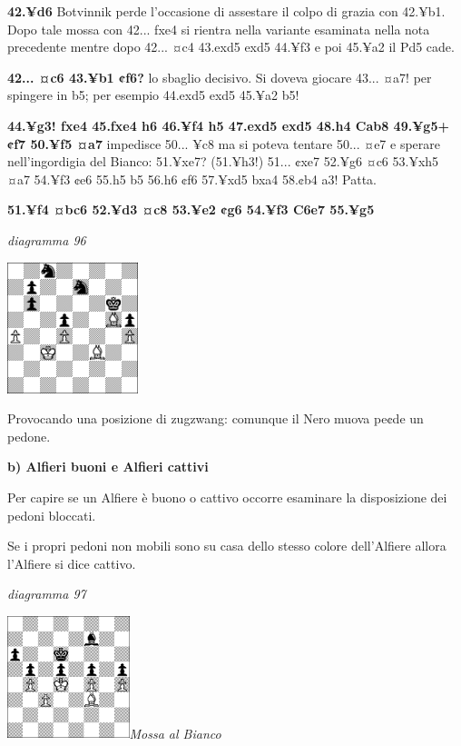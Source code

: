 \documentclass[
]{article}
\begin{document}
\textbf{42.¥d6} Botvinnik perde l'occasione di assestare il colpo di
grazia con 42.¥b1. Dopo tale mossa con 42... fxe4 si rientra nella
variante esaminata nella nota precedente mentre dopo 42... ¤c4 43.exd5
exd5 44.¥f3 e poi 45.¥a2 il Pd5 cade.

\textbf{42... ¤c6 43.¥b1 ¢f6?} lo sbaglio decisivo. Si doveva giocare
43... ¤a7! per spingere in b5; per esempio 44.exd5 exd5 45.¥a2 b5!

\textbf{44.¥g3! fxe4 45.fxe4 h6 46.¥f4 h5 47.exd5 exd5 48.h4 Cab8
49.¥g5+ ¢f7 50.¥f5 ¤a7} impedisce 50... ¥c8 ma si poteva tentare 50...
¤e7 e sperare nell'ingordigia del Bianco: 51.¥xe7? (51.¥h3!) 51... ¢xe7
52.¥g6 ¤c6 53.¥xh5 ¤a7 54.¥f3 ¢e6 55.h5 b5 56.h6 ¢f6 57.¥xd5 bxa4 58.¢b4
a3! Patta.

\textbf{51.¥f4 ¤bc6 52.¥d3 ¤c8 53.¥e2 ¢g6 54.¥f3 C6e7 55.¥g5}

\emph{diagramma 96}

\includegraphics[width=1.5in,height=1.5in]{vertopal_109f12be458a423d8f3cc838880eaea2/media/image96.png}

Provocando una posizione di zugzwang: comunque il Nero muova pe¢de un
pedone.

\textbf{b) Alfieri buoni e Alfieri cattivi}

Per capire se un Alfiere è buono o cattivo occorre esaminare la
disposizione dei pedoni bloccati.

Se i propri pedoni non mobili sono su casa dello stesso colore
dell'Alfiere allora l'Alfiere si dice cattivo.

\emph{diagramma 97}

\includegraphics[width=1.40139in,height=1.40139in]{vertopal_109f12be458a423d8f3cc838880eaea2/media/image97.png}\emph{Mossa
al Bianco}
\end{document}
